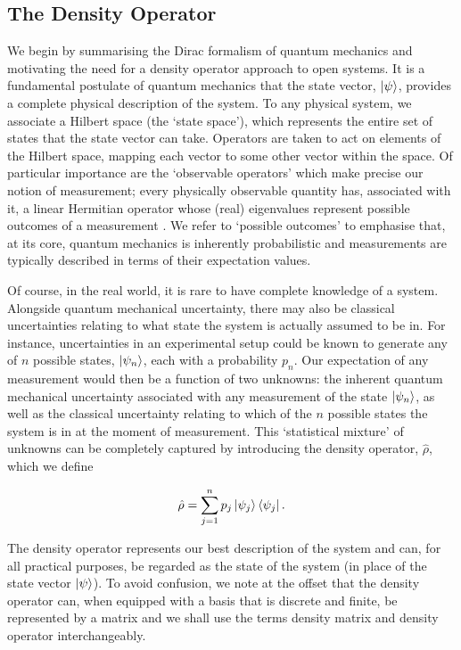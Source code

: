\documentclass[11pt,a4paper]{article}
\numberwithin{equation}{section}
\begin{document}
	\subsection{The Density Operator}
	\label{sec:densityop}
	We begin by summarising the Dirac formalism of quantum mechanics and motivating the need for a density operator approach to open systems. It is a fundamental postulate of quantum mechanics that the state vector, $\ket{\psi}$, provides a complete physical description of the system.  To any physical system, we associate a Hilbert space (the `state space'), which represents the entire set of states that the state vector can take. Operators are taken to act on elements of the Hilbert space, mapping each vector to some other vector within the space. Of particular importance are the `observable operators' which make precise our notion of measurement; every physically observable quantity has, associated with it, a linear Hermitian operator whose (real) eigenvalues represent possible outcomes of a measurement \cite{vonNeumann55}. We refer to `possible outcomes' to emphasise that, at its core, quantum mechanics is inherently probabilistic and measurements are typically described in terms of their expectation values.
	
	Of course, in the real world, it is rare to have complete knowledge of a system. Alongside quantum mechanical uncertainty, there may also be classical uncertainties relating to what state the system is actually assumed to be in. For instance, uncertainties in an experimental setup could be known to generate any of $n$ possible states, $\ket{\psi_n}$, each with a probability $p_n$. Our expectation of any measurement would then be a function of two unknowns: the inherent quantum mechanical uncertainty associated with any measurement of the state $\ket{\psi_n}$, as well as the classical uncertainty relating to which of the $n$ possible states the system is in at the moment of measurement. This `statistical mixture' of unknowns can be completely captured by introducing the density operator, $\hat{\rho}$, which we define \cite{Fano57}
	
	\begin{equation} \label{eq:1}
	\hat{\rho} = \sum_{j=1}^{n} p_j \ket{\psi_j}\bra{\psi_j}.
	\end{equation}
	
	The density operator represents our best description of the system and can, for all practical purposes, be regarded as the state of the system (in place of the state vector $\ket{\psi}$). To avoid confusion, we note at the offset that the density operator can, when equipped with a basis that is discrete and finite, be represented by a matrix and we shall use the terms density matrix and density operator interchangeably.
	
\end{document}

